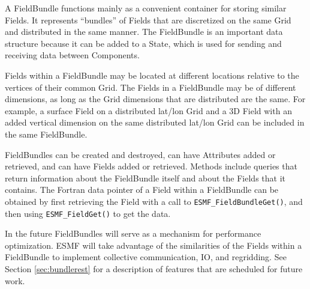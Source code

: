 
A FieldBundle functions mainly as a convenient container for storing
similar Fields.  It represents ``bundles'' of Fields that are 
discretized on the same Grid and distributed in the same manner.
The FieldBundle is an important data structure because it can be added to a State, 
which is used for sending and receiving data between Components.

Fields within a FieldBundle may be located at different locations relative 
to the vertices of their common Grid.  The Fields in a FieldBundle may
be of different dimensions, as long as the Grid dimensions that 
are distributed are the same.  For example, a surface Field on 
a distributed lat/lon Grid and a 3D Field with an added vertical 
dimension on the same distributed lat/lon Grid can be included
in the same FieldBundle.
 
FieldBundles can be created and destroyed, can have Attributes 
added or retrieved, and can have Fields added or retrieved.
Methods include queries that return information about the FieldBundle
itself and about the Fields that it contains.  The Fortran 
data pointer of a Field within a FieldBundle can be obtained 
by first retrieving the Field with a call to {\tt ESMF\_FieldBundleGet()},
and then using {\tt ESMF\_FieldGet()} to get the data.

In the future FieldBundles will serve as a mechanism for performance
optimization.  ESMF will take advantage of the similarities of the
Fields within a FieldBundle to implement collective communication,
IO, and regridding.  See Section \ref{sec:bundlerest} for a 
description of features that are scheduled for future work.
